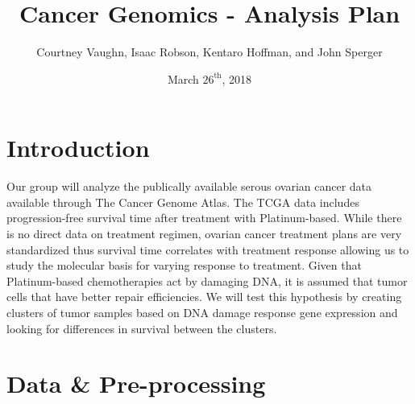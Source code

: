 \documentclass{article}
\author{
Courtney Vaughn, Isaac Robson, Kentaro Hoffman, and John Sperger
}
\title{Cancer Genomics - Analysis Plan}
\date{March $26^{\mathrm{th}}$, 2018}
\begin{document}
\maketitle

\section{Introduction}

  Our group will analyze the publically available serous ovarian cancer data available through The Cancer Genome Atlas. The TCGA data includes progression-free survival time after treatment with Platinum-based. While there is no direct data on treatment regimen, ovarian cancer treatment plans are very standardized thus survival time correlates with treatment response allowing us to study the molecular basis for varying response to treatment. Given that Platinum-based chemotherapies act by damaging DNA, it is assumed that tumor cells that have better repair efficiencies. We will test this hypothesis by creating clusters of tumor samples based on DNA damage response gene expression and looking for differences in survival between the clusters.  
  

\section{Data \& Pre-processing}

\end{document}
